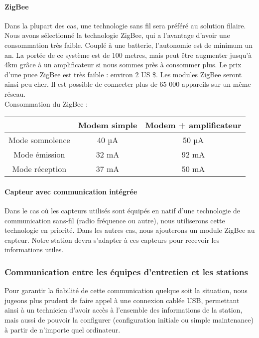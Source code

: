 \paragraph{ZigBee}

Dans la plupart des cas, une technologie sans fil sera préféré au solution filaire. Nous avons sélectionné la technologie ZigBee, qui a l’avantage d’avoir une consommation très faible. Couplé à une batterie, l’autonomie est de minimum un an. 
La portée de ce système est de 100 metres, mais peut être augmenter jusqu’à 4km grâce à un amplificateur si nous sommes près à consommer plus. Le prix d’une puce ZigBee est très faible : environ 2 US \$. Les modules ZigBee seront ainsi peu cher.
Il est possible de connecter plus de 65 000 appareils sur un même réseau.\\

Consommation du ZigBee :

\begin{center}
\begin{tabular}{|c|c|c|}
\hline  & Modem simple & Modem + amplificateur \\ 
\hline Mode somnolence & 40 µA & 50 µA \\ 
\hline Mode émission & 32 mA  & 92 mA \\ 
\hline Mode réception & 37 mA  & 50 mA \\ 
\hline 
\end{tabular} 
\end{center}

\paragraph{Capteur avec communication intégrée}

Dans le cas où les capteurs utilisés sont équipés en natif d’une technologie de communication sans-fil (radio fréquence ou autre), nous utiliserons cette technologie en priorité. Dans les autres cas, nous ajouterons un module ZigBee au capteur. Notre station devra s’adapter à ces capteurs pour recevoir les informations utiles.

\subsubsection{Communication entre les équipes d’entretien et les stations}

Pour garantir la fiabilité de cette communication quelque soit la situation, nous jugeons plus prudent de faire appel à une connexion cablée USB, permettant ainsi à un technicien d’avoir accès à l’ensemble des informations de la station, mais aussi de pouvoir la configurer (configuration initiale ou simple maintenance) à partir de n’importe quel ordinateur.

